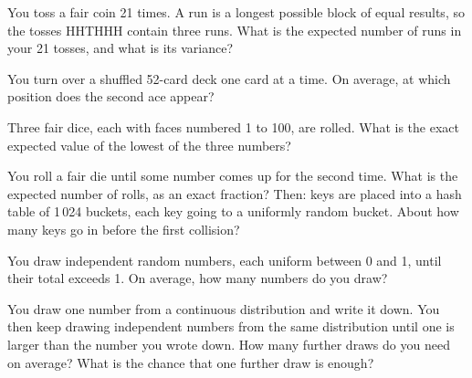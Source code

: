 \begin{question}\label{iq:iv1:expectation-and-indicators:6}
You toss a fair coin 21 times. A run is a longest possible block of equal results, so the tosses HHTHHH contain
three runs. What is the expected number of runs in your 21 tosses, and what is its variance?
\end{question}

\begin{question}\label{iq:iv1:expectation-and-indicators:7}
You turn over a shuffled 52-card deck one card at a time. On average, at which position does the second ace
appear?
\end{question}

\begin{question}\label{iq:iv1:expectation-and-indicators:8}
Three fair dice, each with faces numbered 1 to 100, are rolled. What is the exact expected value of the lowest of
the three numbers?
\end{question}

\begin{question}\label{iq:iv1:expectation-and-indicators:9}
You roll a fair die until some number comes up for the second time. What is the expected number of rolls, as an
exact fraction? Then: keys are placed into a hash table of 1\,024 buckets, each key going to a uniformly random
bucket. About how many keys go in before the first collision?
\end{question}

\begin{question}\label{iq:iv1:expectation-and-indicators:10}
You draw independent random numbers, each uniform between 0 and 1, until their total exceeds 1. On average, how
many numbers do you draw?
\end{question}

\begin{question}\label{iq:iv1:expectation-and-indicators:11}
You draw one number from a continuous distribution and write it down. You then keep drawing independent numbers
from the same distribution until one is larger than the number you wrote down. How many further draws do you
need on average? What is the chance that one further draw is enough?
\end{question}

